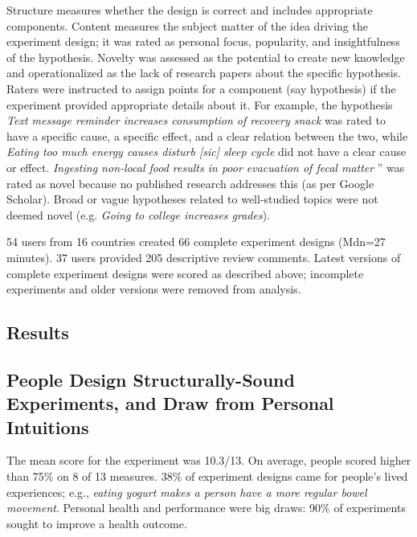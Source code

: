 Structure measures whether the design is correct and includes appropriate components. Content measures the subject matter of the idea driving the experiment design; it was rated as personal focus, popularity, and insightfulness of the hypothesis. Novelty was assessed as the potential to create new knowledge and operationalized as the lack of research papers about the specific hypothesis. Raters were instructed to assign points for a component (say hypothesis) if the experiment provided appropriate details about it. For example, the hypothesis \textit{Text message reminder increases consumption of recovery snack} was rated to have a specific cause, a specific effect, and a clear relation between the two, while \textit{Eating too much energy causes disturb [sic] sleep cycle} did not have a clear cause or effect. \textit{Ingesting non-local food results in poor evacuation of fecal matter} '' was rated as novel because no published research addresses this (as per Google Scholar). Broad or vague hypotheses related to well-studied topics were not deemed novel (e.g. \textit{Going to college increases grades}).

54 users from 16 countries created 66 complete experiment designs (Mdn=27 minutes). 37 users provided 205 descriptive review comments. Latest versions of complete experiment designs were scored as described above; incomplete experiments and older versions were removed from analysis. 

\subsection*{Results}
\subsection{People Design Structurally-Sound Experiments, and Draw from Personal Intuitions}
The mean score for the experiment was 10.3/13. On average, people scored higher than 75\% on 8 of 13 measures. 38\% of experiment designs came for people's lived experiences; e.g., \textit{eating yogurt makes a person have a more regular bowel movement}. Personal health and performance were big draws: 90\% of experiments sought to improve a health outcome. 

